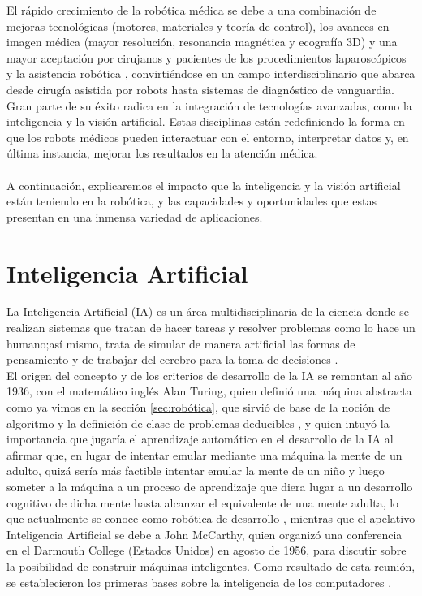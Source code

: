 El rápido crecimiento de la robótica médica se debe a una combinación de mejoras tecnológicas (motores, materiales y teoría de control), los avances en imagen médica (mayor resolución, resonancia magnética y ecografía 3D) y una mayor aceptación por cirujanos y pacientes de los procedimientos laparoscópicos y la asistencia robótica \cite{Beasley12}, convirtiéndose en un campo interdisciplinario que abarca desde cirugía asistida por robots hasta sistemas de diagnóstico de vanguardia. Gran parte de su éxito radica en la integración de tecnologías avanzadas, como la inteligencia y la visión artificial. Estas disciplinas están redefiniendo la forma en que los robots médicos pueden interactuar con el entorno, interpretar datos y, en última instancia, mejorar los resultados en la atención médica.\\
\\

A continuación, explicaremos el impacto que la inteligencia y la visión artificial están teniendo en la robótica, y las capacidades y oportunidades que estas presentan en una inmensa variedad de aplicaciones.

\section{Inteligencia Artificial}
\label{sec:IA} 

La Inteligencia Artificial (IA) es un área multidisciplinaria de la ciencia %
donde se realizan sistemas que tratan de hacer tareas y resolver problemas como lo hace un humano;así mismo, trata de simular de manera artificial las formas de pensamiento y de trabajar del cerebro para la toma de decisiones \cite{Ponce14}.\\

El origen del concepto y de los criterios de desarrollo de la IA se remontan al año 1936, con el matemático inglés Alan Turing, quien definió una máquina abstracta como ya vimos en la sección \ref{sec:robótica}, que sirvió de base de la noción de algoritmo y la definición de clase de problemas deducibles \cite{Hardy01}, y quien intuyó la importancia que jugaría el aprendizaje automático en el desarrollo de la IA al afirmar que, en lugar de intentar emular mediante una máquina la mente de un adulto, quizá sería más factible intentar emular la mente de un niño y luego someter a la máquina a un proceso de aprendizaje que diera lugar a un desarrollo cognitivo de dicha mente hasta alcanzar el equivalente de una mente adulta, lo que actualmente se conoce como robótica de desarrollo \cite{Gonzalez17}, mientras que el apelativo Inteligencia Artificial se debe a John McCarthy, quien organizó una conferencia en el Darmouth College (Estados Unidos) en agosto de 1956, para discutir sobre la posibilidad de construir máquinas inteligentes. Como resultado de esta reunión, se establecieron los primeras bases sobre la inteligencia de los computadores \cite{Ponce14}. \\
\\

